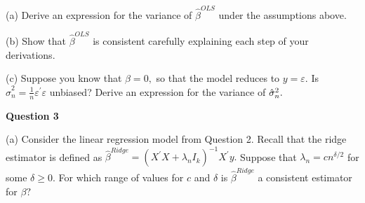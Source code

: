 \documentclass{article}
\begin{document}
(a) Derive an expression for the variance of $\hat{\beta}^{OLS}$ under the
assumptions above$.$

(b) Show that $\hat{\beta}^{OLS}$ is consistent carefully explaining each
step of your derivations.

(c) Suppose you know that $\beta =0,$ so that the model reduces to $%
y=\varepsilon .$ Is $\hat{\sigma}_{n}^{2}=\frac{1}{n}\varepsilon ^{\prime
}\varepsilon $ unbiased? Derive an expression for the variance of $\hat{%
\sigma}_{n}^{2}.$

\bigskip

\textbf{Question 3 }

(a) Consider the linear regression model from Question 2. Recall that the
ridge estimator is defined as $\hat{\beta}^{Ridge}=\left( X^{\prime
}X+\lambda _{n}I_{k}\right) ^{-1}X^{\prime }y.$ Suppose that $\lambda
_{n}=cn^{\delta /2}$ for some $\delta \geq 0.$ For which range of values for 
$c$ and $\delta $ is $\hat{\beta}^{Ridge}$ a consistent estimator for $\beta
?$
\end{document}
